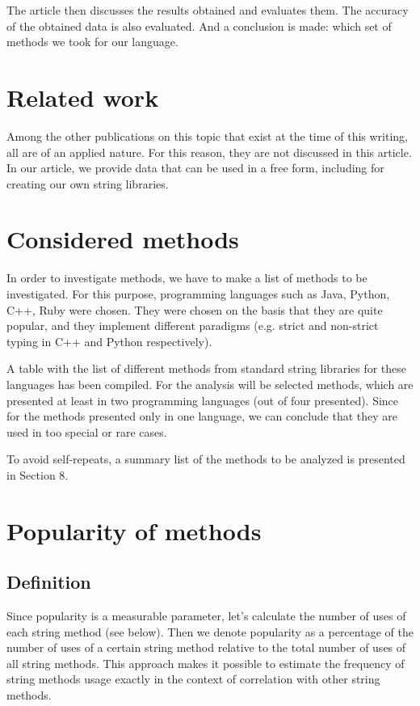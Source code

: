 \documentclass[anonymous,sigplan,review,11pt,nonacm,natbib=false]{acmart}
\begin{document}
    The article then discusses the results obtained and evaluates them. The accuracy of the obtained data is also evaluated. And a conclusion is made: which set of methods we took for our language.

    \section{Related work}

    Among the other publications on this topic that exist at the time of this writing, all are of an applied nature. For this reason, they are not discussed in this article. In our article, we provide data that can be used in a free form, including for creating our own string libraries.

    \section{Considered methods}

    In order to investigate methods, we have to make a list of methods to be investigated. For this purpose, programming languages such as Java, Python, C++, Ruby were chosen. They were chosen on the basis that they are quite popular, and they implement different paradigms (e.g. strict and non-strict typing in C++ and Python respectively).

    A table with the list of different methods from standard string libraries for these languages has been compiled. For the analysis will be selected methods, which are presented at least in two programming languages (out of four presented). Since for the methods presented only in one language, we can conclude that they are used in too special or rare cases.

    To avoid self-repeats, a summary list of the methods to be analyzed is presented in Section 8.

    \section{Popularity of methods}

    \subsection{Definition}

    Since popularity is a measurable parameter, let's calculate the number of uses of each string method (see below). Then we denote popularity as a percentage of the number of uses of a certain string method relative to the total number of uses of all string methods. This approach makes it possible to estimate the frequency of string methods usage exactly in the context of correlation with other string methods.
\end{document}
